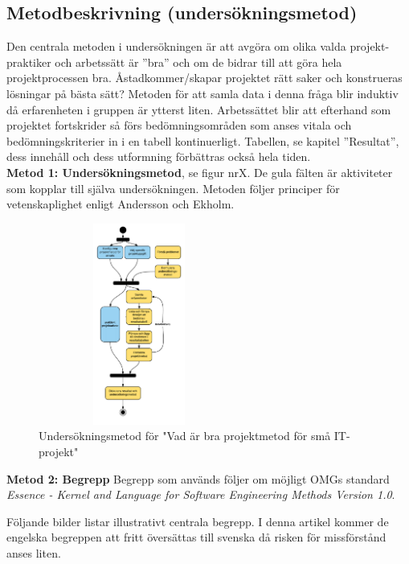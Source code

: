 \subsection{Metodbeskrivning (undersökningsmetod)}
Den centrala metoden i undersökningen är att avgöra om olika valda projekt-praktiker 
och arbetssätt är ”bra” och om de bidrar till att göra hela projektprocessen bra. 
Åstadkommer/skapar projektet rätt saker och konstrueras lösningar på bästa sätt? 
Metoden för att samla data i denna fråga blir induktiv då erfarenheten i gruppen är 
ytterst liten. Arbetssättet blir att efterhand som projektet fortskrider så förs 
bedömningsområden som anses vitala och bedömningskriterier in i en tabell kontinuerligt. 
Tabellen, se kapitel ”Resultat”, dess innehåll och dess utformning förbättras också hela 
tiden.\\

\textbf{Metod 1: Undersökningsmetod}, se figur nrX. De gula fälten är aktiviteter som 
kopplar till själva undersökningen. Metoden följer principer för vetenskaplighet 
enligt Andersson och Ekholm.
 
\begin{figure}[htbp]
    \centerline{\includegraphics[max height=250px, max width=250px]{Z. images/undersokningsmetod.png}}
    \caption{Undersökningsmetod för "Vad är bra projektmetod för små IT-projekt"}
    \label{fig}
\end{figure}

\textbf{Metod 2: Begrepp}
Begrepp som används följer om möjligt OMGs standard 
\textit{Essence - Kernel and Language for Software Engineering Methods Version 1.0}.

Följande bilder listar illustrativt centrala begrepp. I denna artikel kommer de engelska
begreppen att fritt översättas till svenska då risken för missförstånd anses liten.

